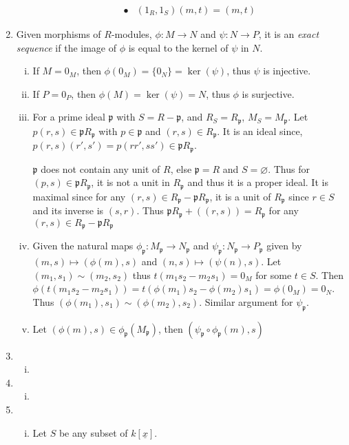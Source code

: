 \documentclass[a4paper,10pt]{article}
\theoremstyle{definition}
\begin{document}
\begin{enumerate}[1.]
\begin{enumerate}[(i)]
\begin{align*}
\bullet &(1_R,1_S)(m,t) = (m,t)
\end{align*}
\end{enumerate}
\item Given morphisms of $R$-modules, $\phi:M \to N$ and $\psi:N\to P$, it is an \emph{exact sequence} if the image of $\phi$ is equal to the kernel of $\psi$ in $N$.
\begin{enumerate}[(i)]
\item If $M=0_M$, then $\phi(0_M) = \{0_N\} = \ker(\psi)$, thus $\psi$ is injective.
\item If $P=0_P$, then $\phi(M) = \ker(\psi) = N$, thus $\phi$ is surjective.
\item For a prime ideal $\mathfrak{p}$ with $S = R - \mathfrak{p}$, and $R_S = R_\mathfrak{p}$, $M_S = M_\mathfrak{p}$. Let $p(r,s) \in \mathfrak{p}R_{\mathfrak{p}}$ with $p \in \mathfrak{p}$ and $(r,s) \in R_{\mathfrak{p}}$. It is an ideal since, $p(r,s)(r',s')=p(rr',ss') \in \mathfrak{p}R_{\mathfrak{p}}$. 


$\mathfrak{p}$ does not contain any unit of $R$, else $\mathfrak{p} = R$ and $S = \varnothing$. Thus for $(p,s) \in \mathfrak{p}R_{\mathfrak{p}}$, it is not a unit in $R_{\mathfrak{p}}$ and thus it is a proper ideal. It is maximal since for any $(r,s) \in R_{\mathfrak{p}}-\mathfrak{p}R_{\mathfrak{p}}$, it is a unit of $R_{\mathfrak{p}}$ since $r \in S$ and its inverse is $(s,r)$. Thus $\mathfrak{p}R_{\mathfrak{p}}+((r,s)) = R_{\mathfrak{p}}$ for any $(r,s) \in R_{\mathfrak{p}}-\mathfrak{p}R_{\mathfrak{p}}$

\item Given the natural maps $\phi_\mathfrak{p}:M_{\mathfrak{p}} \to N_{\mathfrak{p}}$ and $\psi_\mathfrak{p}:N_{\mathfrak{p}} \to P_{\mathfrak{p}}$ given by $(m,s) \mapsto (\phi(m),s)$ and $(n,s) \mapsto (\psi(n),s)$. Let $(m_1,s_1) \sim (m_2,s_2)$ thus $t(m_1s_2-m_2s_1)=0_M$ for some $t \in S$. Then $\phi(t(m_1s_2-m_2s_1))=t(\phi(m_1)s_2-\phi(m_2)s_1)=\phi(0_M)=0_N$. Thus $(\phi(m_1),s_1)\sim(\phi(m_2),s_2)$. Similar argument for $\psi_{\mathfrak{p}}$. 
\item Let $(\phi(m),s) \in \phi_{\mathfrak{p}}(M_{\mathfrak{p}})$, then $(\psi_{\mathfrak{p}}\circ\phi_{\mathfrak{p}}(m),s)$
\end{enumerate}
\item
\begin{enumerate}[(i)]
\item
\end{enumerate}
\item
\begin{enumerate}[(i)]
\item
\end{enumerate}
\item
\begin{enumerate}[(i)]
\item Let $S$ be any subset of $k[\underline{x}]$.




\end{enumerate}
\end{enumerate}
\end{document}
